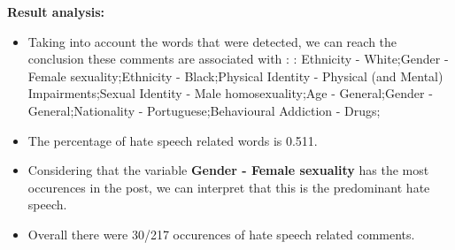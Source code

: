 \documentclass[11pt]{article}
\begin{document}
\textbf{\Large Result analysis:}

\begin{itemize}\item Taking into account the words that were detected, we can reach the conclusion these comments are associated with : : Ethnicity - White;Gender - Female sexuality;Ethnicity - Black;Physical Identity - Physical (and Mental) Impairments;Sexual Identity - Male homosexuality;Age - General;Gender - General;Nationality - Portuguese;Behavioural Addiction - Drugs;%

\item The percentage of hate speech related words is 0.511.

\item Considering that the variable \textbf{Gender - Female sexuality} has the most occurences in the post, we can interpret that this is the predominant hate speech.

\item Overall there were 30/217 occurences of hate speech related comments.\end{itemize}
\end{document}
